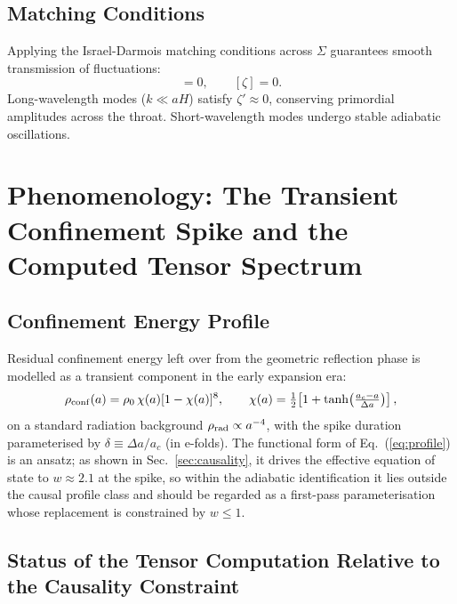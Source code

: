 \documentclass[reprint,superscriptaddress,amsmath,amssymb,aps,prd,showkeys,nofootinbib]{revtex4-2}
\begin{document}
\subsection{Matching Conditions}
Applying the Israel-Darmois matching conditions across $\Sigma$ guarantees smooth
transmission of fluctuations:
\begin{equation}
[\Phi] = 0,\qquad[\zeta] = 0.
\end{equation}
Long-wavelength modes ($k\ll aH$) satisfy $\zeta'\approx0$, conserving primordial
amplitudes across the throat. Short-wavelength modes undergo stable adiabatic oscillations.

\section{Phenomenology: The Transient Confinement Spike and the Computed Tensor Spectrum}
\label{sec:pheno}

\subsection{Confinement Energy Profile}

Residual confinement energy left over from the geometric reflection phase is modelled as a
transient component in the early expansion era:
\begin{equation}
\rho_{\rm conf}(a) = \rho_0\,\chi(a)[1-\chi(a)]^8,
\qquad
\chi(a)=\tfrac{1}{2}\!\left[1+\tanh\!\left(\tfrac{a_c-a}{\Delta a}\right)\right],
\label{eq:profile}
\end{equation}
on a standard radiation background $\rho_{\rm rad}\propto a^{-4}$, with the spike duration
parameterised by $\delta \equiv \Delta a/a_c$ (in e-folds). The functional form of
Eq.~(\ref{eq:profile}) is an ansatz; as shown in Sec.~\ref{sec:causality}, it drives the
effective equation of state to $w\approx2.1$ at the spike, so within the adiabatic
identification it lies outside the causal profile class and should be regarded as a
first-pass parameterisation whose replacement is constrained by $w\leq1$.

\subsection{Status of the Tensor Computation Relative to the Causality Constraint}
\label{sec:pheno-status}
\end{document}
